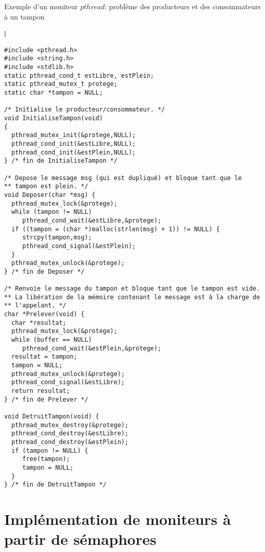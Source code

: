 \begin{algorithm}[!ht]
\caption{Exemple d'un moniteur $pthread$: problème des producteurs et des consommateurs à un tampon}\label{moniteurs:pthreadProdCons}
\begin{center}
\begin{tabular}{l}
\lstset{language=C++}
\begin{lstlisting}
#include <pthread.h>
#include <string.h>
#include <stdlib.h>
static pthread_cond_t estLibre, estPlein;
static pthread_mutex_t protege;
static char *tampon = NULL;

/* Initialise le producteur/consommateur. */
void InitialiseTampon(void)
{
  pthread_mutex_init(&protege,NULL);
  pthread_cond_init(&estLibre,NULL);
  pthread_cond_init(&estPlein,NULL);
} /* fin de InitialiseTampon */

/* Depose le message msg (qui est dupliqué) et bloque tant que le
** tampon est plein. */
void Deposer(char *msg) {
  pthread_mutex_lock(&protege);
  while (tampon != NULL)
     pthread_cond_wait(&estLibre,&protege);
  if ((tampon = (char *)malloc(strlen(msg) + 1)) != NULL) {
     strcpy(tampon,msg);
     pthread_cond_signal(&estPlein);
  }
  pthread_mutex_unlock(&protege);
} /* fin de Deposer */

/* Renvoie le message du tampon et bloque tant que le tampon est vide.
** La libération de la mémoire contenant le message est à la charge de
** l'appelant. */
char *Prelever(void) {
  char *resultat;
  pthread_mutex_lock(&protege);
  while (buffer == NULL)
     pthread_cond_wait(&estPlein,&protege);
  resultat = tampon;
  tampon = NULL;
  pthread_mutex_unlock(&protege);
  pthread_cond_signal(&estLibre);
  return resultat;
} /* fin de Prelever */

void DetruitTampon(void) {
  pthread_mutex_destroy(&protege);
  pthread_cond_destroy(&estLibre);
  pthread_cond_destroy(&estPlein);
  if (tampon != NULL) {
     free(tampon);
     tampon = NULL;
  }
} /* fin de DetruitTampon */
\end{lstlisting}
\end{tabular}
\end{center}
\end{algorithm}

\section{Implémentation de moniteurs à partir de sémaphores}

